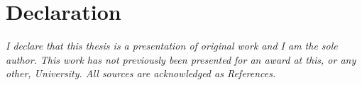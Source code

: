 \chapter{Declaration}

\emph{I declare that this thesis is a presentation of original work and I am the sole author. This work has not previously been presented for an award at this, or any other, University. All sources are acknowledged as References.}